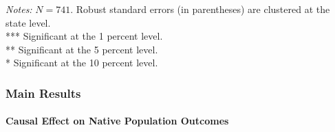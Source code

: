 \begin{frame}
\begin{table}[ht]
{\begin{tabular}{rcccccccccccc}
            \bottomrule
            \end{tabular}
        }
        \vspace{0.2cm}
        
        \begin{minipage}{\linewidth}
            \tiny
            \textit{Notes:} $N = 741$. Robust standard errors (in parentheses) are clustered at the state level.\\
            *** Significant at the 1 percent level. \\
            ** Significant at the 5 percent level. \\
            * Significant at the 10 percent level.
        \end{minipage}
    \end{table}
\end{frame}

\begin{frame}
    \frametitle{Main Results}
    \framesubtitle{Causal Effect on Native Population Outcomes}

    \lipsum[1]

\end{frame}